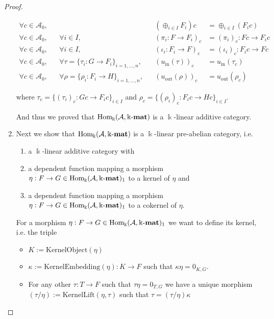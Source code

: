 \begin{proof}
\begin{enumerate}
\begin{subproof}[Proof of (ii)]
\begin{align*}
\forall c \in \mathcal{A}_{0},&& &&  (\oplus_{i \in I} F_{i}) c &= \oplus_{i \in I} (F_{i} c) \\
\forall c \in \mathcal{A}_{0},&& \forall i \in I,&& (\pi_{i} : F \rightarrow F_{i})_{c} &= (\pi_{i})_{c} : Fc \rightarrow F_{i} c \\
\forall c \in \mathcal{A}_{0},&& \forall i \in I,&& (\iota_{i} : F_{i} \rightarrow F)_{c} &= (\iota_{i})_{c} : F_{i} c \rightarrow Fc \\
\forall c \in \mathcal{A}_{0},&& \forall \tau = \{ \tau_{i} : G \rightarrow F_{i} \}_{i = 1,\dots,n},&&
(u_{\mathrm{in}}(\tau))_{c} &= u_{\mathrm{in}}(\tau_{c}) \\
\forall c \in \mathcal{A}_{0},&& \forall \rho = \{ \rho_{i} : F_{i} \rightarrow H \}_{i = 1,\dots,n},&&
(u_{\mathrm{out}}(\rho))_{c} &= u_{\mathrm{out}}(\rho_{c})
\end{align*}

where $\tau_{c} = \{ (\tau_{i})_{c} : Gc \rightarrow F_{i}c \}_{i \in I}$ and $\rho_{c} = \{ (\rho_{i})_{c} : F_{i} c \rightarrow Hc \}_{i \in I}$.

And thus we proved that $\mathrm{Hom_{\Bbbk}}(\mathcal{A},\Bbbk\textnormal{-}\mathbf{mat})$ is a $\Bbbk$-linear additive category.
\end{subproof}

\item Next we show that $\mathrm{Hom_{\Bbbk}}(\mathcal{A},\Bbbk\textnormal{-}\mathbf{mat})$ is a $\Bbbk$-linear pre-abelian category, i.e.
\begin{enumerate}
\renewcommand{\labelenumii}{(\roman{enumii})}
\item a $\Bbbk$-linear additive category with
\item a dependent function mapping a morphism $\eta : F \rightarrow G \in \mathrm{Hom_{\Bbbk}}(\mathcal{A},\Bbbk\textnormal{-}\mathbf{mat})_{1}$ to a kernel of $\eta$ and
\item a dependent function mapping a morphism $\eta : F \rightarrow G \in \mathrm{Hom_{\Bbbk}}(\mathcal{A},\Bbbk\textnormal{-}\mathbf{mat})_{1}$ to a cokernel of $\eta$.
\end{enumerate}
\begin{subproof}[Proof of (ii)]
For a morphism $\eta : F \rightarrow G \in \mathrm{Hom_{\Bbbk}}(\mathcal{A},\Bbbk\textnormal{-}\mathbf{mat})_{1}$ we want to define its kernel, i.e. the triple
\begin{itemize}
\item $K := \mathrm{KernelObject}(\eta)$
\item $\kappa := \mathrm{KernelEmbedding}(\eta) : K \rightarrow F$ such that $\kappa \eta = 0_{K,G}$.
\item For any other $\tau : T \rightarrow F$ such that $\tau\eta = 0_{T,G}$ we have a unique morphism
$(\tau / \eta) := \mathrm{KernelLift}(\eta,\tau)$ such that $\tau = (\tau / \eta) \kappa$
\end{itemize}


\end{subproof}
\end{enumerate}
\end{proof}

